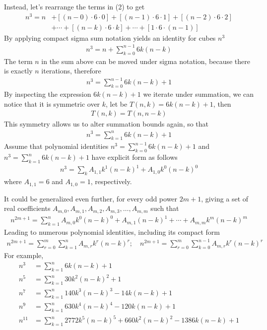 Instead, let's rearrange the terms in (2) to get
\begin{align*}
    n^3 = n &+ [(n-0) \cdot 6 \cdot 0] + [(n-1)\cdot6\cdot1] + [(n-2)\cdot6\cdot2] \\
    &+ \cdots + [(n-k)\cdot 6 \cdot k] + \cdots + [1\cdot6\cdot(n-1)]
\end{align*}
By applying compact sigma sum notation yields an identity for cubes $n^3$
\begin{align*}
    n^3 = n + \sum_{k=0}^{n-1} 6k(n-k)
\end{align*}
The term $n$ in the sum above can be moved under sigma notation, because there is exactly $n$ iterations, therefore
\begin{align*}
    n^3 = \sum_{k=0}^{n-1} 6k(n-k) + 1
\end{align*}
By inspecting the expression $6k(n-k) + 1$ we iterate under summation,
we can notice that it is symmetric over $k$, let be $T(n,k) = 6k(n-k) + 1$, then
\begin{align*}
    T(n,k) = T(n,n-k)
\end{align*}
This symmetry allows us to alter summation bounds again, so that
\begin{align*}
    n^3 = \sum_{k=1}^{n} 6k(n-k) + 1
\end{align*}
Assume that polynomial identities
$n^3 = \sum_{k=0}^{n-1} 6k(n-k) + 1$ and $n^3 = \sum_{k=1}^{n} 6k(n-k) + 1$
have explicit form as follows
\begin{align*}
    n^3 = \sum_{k} A_{1,1} k^1(n-k)^1 + A_{1,0} k^0(n-k)^0
\end{align*}
where $A_{1,1} = 6$ and $A_{1,0} = 1$, respectively.

It could be generalized even further, for every odd power $2m+1$, giving a set of real coefficients
$A_{m,0}, A_{m,1},A_{m,2},A_{m,3}, \ldots, A_{m,m}$ such that
\begin{align*}
    n^{2m+1} = \sum_{k=1}^{n} A_{m,0} k^0 (n-k)^0 + A_{m,1} (n-k)^1
    + \cdots + A_{m,m} k^m (n-k)^m
\end{align*}
Leading to numerous polynomial identities, including its compact form
\begin{align*}
    n^{2m+1} = \sum_{r=0}^{m} \sum_{k=1}^{n} A_{m,r} k^r (n-k)^r; \quad n^{2m+1} = \sum_{r=0}^{m} \sum_{k=0}^{n-1} A_{m,r} k^r (n-k)^r
\end{align*}
For example,
\begin{align*}
    n^3 &= \sum_{k=1}^{n} 6k(n-k) + 1 \\
    n^5 &= \sum_{k=1}^{n} 30k^2(n-k)^2 + 1 \\
    n^7 &= \sum_{k=1}^{n} 140 k^3 (n-k)^3 - 14k(n-k) + 1 \\
    n^9 &= \sum_{k=1}^{n} 630 k^4(n-k)^4 - 120k(n-k) + 1 \\
    n^{11} &= \sum_{k=1}^{n} 2772 k^5(n-k)^5 + 660 k^2(n-k)^2 - 1386k(n-k) + 1
\end{align*}
